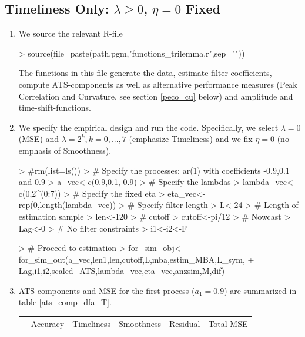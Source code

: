 \documentclass[a4paper]{book}
\begin{document}
\subsection{Timeliness Only: $\lambda\geq0$, $\eta=0$ Fixed}

\begin{enumerate}
\item We source the relevant R-file 
\begin{Schunk}
\begin{Sinput}
> source(file=paste(path.pgm,"functions_trilemma.r",sep=""))
\end{Sinput}
\end{Schunk}
The functions in this file generate the data, estimate filter coefficients, compute  ATS-components as well as alternative performance measures (Peak Correlation and Curvature, see section \ref{peco_cu} below) and amplitude and time-shift-functions. 
\item We specify the empirical design and run the code. Specifically, we select $\lambda=0$ (MSE) and $\lambda=2^k, k=0,...,7$ (emphasize Timeliness) and we fix $\eta=0$ (no emphasis of Smoothness).
\begin{Schunk}
\begin{Sinput}
> #rm(list=ls())
> # Specify the processes: ar(1) with coefficients -0.9,0.1 and 0.9
> a_vec<-c(0.9,0.1,-0.9)
> # Specify the lambdas
> lambda_vec<-c(0,2^(0:7))
> # Specify the fixed eta
> eta_vec<-rep(0,length(lambda_vec))
> # Specify filter length
> L<-24
> # Length of estimation sample
> len<-120
> # cutoff
> cutoff<-pi/12
> # Nowcast
> Lag<-0
> # No filter constraints
> i1<-i2<-F
\end{Sinput}
\end{Schunk}
\begin{Schunk}
\begin{Sinput}
> # Proceed to estimation
> for_sim_obj<-for_sim_out(a_vec,len1,len,cutoff,L,mba,estim_MBA,L_sym,
+               Lag,i1,i2,scaled_ATS,lambda_vec,eta_vec,anzsim,M,dif)
\end{Sinput}
\end{Schunk}
\item ATS-components and MSE for the first process ($a_1=0.9$) are summarized in table \ref{ats_comp_dfa_T}.\\
\begin{table}[ht]
\centering
\begin{tabular}{rrrrrr}
  \hline
 & Accuracy & Timeliness & Smoothness & Residual & Total MSE \\ 

\end{tabular}
\end{table}
\end{enumerate}
\end{document}
